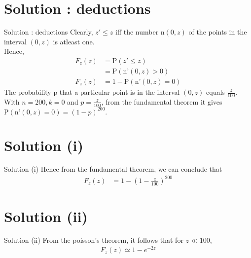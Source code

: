 \documentclass{beamer}
\begin{document}
\section{Solution : deductions}
\begin{frame}{Solution : deductions}
Clearly, $z' \leq z$ iff the number n$(0,z)$ of the points in the interval $(0,z)$ is atleast one.\\
	Hence,
	\begin{align}
	F_{z}(z) &= \text{P}(z' \leq z) \\
	         &= \text{P}(\text{n'}(0,z)>0)\\
	F_{z}(z) &= 1-\text{P}(\text{n'}(0,z)=0)
	\end{align}
	The probability p that a particular point is in the interval $(0,z)$ equals $\frac{z}{100}$. With $n=200,k=0$ and $p=\frac{z}{100}$, from the fundamental theorem it gives $\text{P}(\text{n'}(0,z)=0)=(1-p)^{200}$.\\
\end{frame} 
\section{Solution (i)}
\begin{frame}{Solution (i)} Hence from the fundamental theorem, we can conclude that
\begin{align}
	F_{z}(z) &= 1-(1-\frac{z}{100})^{200}
	\end{align}

\end{frame}
\section{Solution (ii)}
\begin{frame}{Solution (ii)}
From the poisson's theorem, it follows that for $z \ll 100$,
	\begin{align}
	F_{z}(z) \simeq 1-e^{-2z}
\end{align}
\end{frame}
\end{document}
